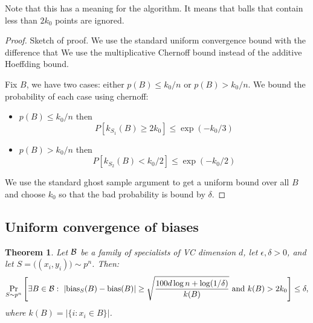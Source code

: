 \documentclass{article}
\newtheorem{theorem}{Theorem}[section]
\newcommand{\B}{{\cal B}}
\newcommand{\bias}{\text{bias}}
\newcommand{\samp}{S}
\newcommand{\eps}{\epsilon}
\begin{document}
Note that this has a meaning for the algorithm. It means that balls
that contain less than $2k_0$ points are ignored.

\begin{proof}
  Sketch of proof. We use the standard uniform convergence bound with
  the difference that We use the multiplicative Chernoff bound instead
  of the additive Hoeffding bound. 

  Fix $B$, we have two cases: either $p(B) \leq k_0/n$ or
  $p(B)>k_0/n$. We bound the probability of each case using chernoff:
  \begin{itemize}
  \item $p(B) \leq k_0/n$ then
  \[
  P\left[ k_{\samp_1}(B) \geq 2 k_0 \right] \leq \exp(-k_0/3)
  \]
  \item $p(B) > k_0/n$ then
  \[
  P\left[ k_{\samp_2}(B) < k_0/2 \right] \leq \exp(-k_0/2)
  \]
  \end{itemize}

  We use the standard ghost sample argument to get a uniform bound
  over all $B$ and choose $k_0$ so that the bad probability is bound by $\delta$.

  \end{proof}

\subsection{Uniform convergence of biases}
\begin{theorem}
Let $\B$ be a family of specialists of VC dimension $d$, 
let $\eps,\delta>0$,
and let $S=\bigl((x_i,y_i)\bigr) \sim p^n$.
Then:
\[\Pr_{\samp\sim p^n}\left[\exists {B\in\B}:~\lvert
  \bias_{\samp}(B) -  \bias(B)\rvert \geq \sqrt{\frac{100d\log n +
      \log(1/\delta)}{k(B)} }
  \mbox{ and } k(B)>2k_0
  \right] \leq \delta,
\]
where $k(B) = \lvert\{ i : x_i\in B \}\rvert$.
\end{theorem}
\end{document}
